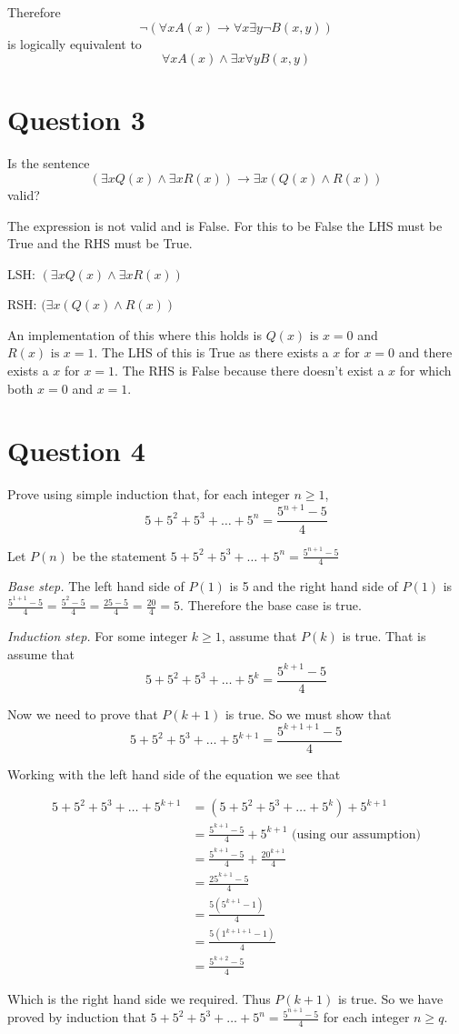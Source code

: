 \documentclass[11pt]{article}
\begin{document}
Therefore $$\neg (\forall xA(x) \to \forall x \exists y \neg B(x, y))$$ is logically equivalent to $$\forall xA(x) \land \exists x \forall y B(x, y)$$

\break

\section*{Question 3}
Is the sentence
$$(\exists xQ(x) \land \exists xR(x)) \to \exists x(Q(x) \land R(x))$$
valid?

The expression is not valid and is False. For this to be False the LHS must be True and the RHS must be True.

LSH: $(\exists xQ(x) \land \exists xR(x))$

RSH: $(\exists x(Q(x) \land R(x))$

An implementation of this where this holds is $Q(x) \text{ is } x = 0$ and $R(x) \text{ is } x = 1$. The LHS of this is True as there exists a $x$ for $x=0$ and there exists a $x$ for $x=1$. The RHS is False because there doesn't exist a $x$ for which both $x=0$ and $x=1$.

\break

\section*{Question 4}
Prove using simple induction that, for each integer $n \geq 1$,
$$5+5^2+5^3+\dots + 5^n = \frac{5^{n+1}-5}{4}$$

Let $P(n)$ be the statement $5+5^2+5^3+\dots + 5^n = \frac{5^{n+1}-5}{4}$

\emph{Base step.} The left hand side of $P(1)$ is 5 and the right hand side of $P(1)$ is $\frac{5^{1+1}-5}{4} = \frac{5^2-5}{4}=\frac{25-5}{4} = \frac{20}{4} = 5$. Therefore the base case is true.

\emph{Induction step.} For some integer $k \geq 1$, assume that $P(k)$ is true. That is assume that
$$5 + 5^2 + 5^3 + \dots + 5^k = \frac{5^{k+1}-5}{4}$$

Now we need to prove that $P(k+1)$ is true. So we must show that
$$5 + 5^2 + 5^3 + \dots + 5^{k+1} = \frac{5^{k+1+1}-5}{4}$$

Working with the left hand side of the equation we see that

\begin{align*}
	5+5^2+5^3+ \dots + 5^{k+1} &= (5 + 5^2 + 5^3 + \dots + 5^k) + 5^{k+1} \\
	&= \frac{5^{k+1}-5}{4} + 5^{k+1} \text{ (using our assumption)} \\
	&= \frac{5^{k+1}-5}{4} + \frac{20^{k+1}}{4} \\
	&= \frac{25^{k+1}-5}{4} \\
	&= \frac{5(5^{k+1}-1)}{4} \\
	&= \frac{5(1^{k+1+1}-1)}{4} \\
	&= \frac{5^{k+2}-5}{4}
\end{align*}

Which is the right hand side we required. Thus $P(k+1)$ is true. So we have proved by induction that $5+5^2+5^3+\dots + 5^n = \frac{5^{n+1}-5}{4}$ for each integer $n \geq q$.
\end{document}
